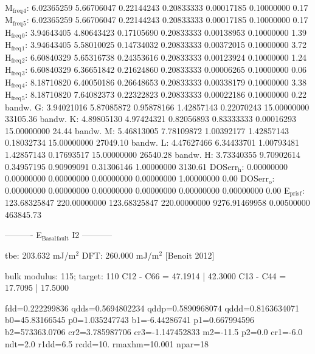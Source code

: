 \documentclass[11pt]{article}
\begin{document}
M\(_{\text{freq}}\)\(_{\text{4}}\):   6.02365259   5.66706047   0.22144243   0.20833333   0.00017185   0.10000000         0.17
M\(_{\text{freq}}\)\(_{\text{5}}\):   6.02365259   5.66706047   0.22144243   0.20833333   0.00017185   0.10000000         0.17
H\(_{\text{freq}}\)\(_{\text{0}}\):   3.94643405   4.80643423   0.17105690   0.20833333   0.00138953   0.10000000         1.39
H\(_{\text{freq}}\)\(_{\text{1}}\):   3.94643405   5.58010025   0.14734032   0.20833333   0.00372015   0.10000000         3.72
H\(_{\text{freq}}\)\(_{\text{2}}\):   6.60840329   5.65316738   0.24353616   0.20833333   0.00123924   0.10000000         1.24
H\(_{\text{freq}}\)\(_{\text{3}}\):   6.60840329   6.36651842   0.21624860   0.20833333   0.00006265   0.10000000         0.06
H\(_{\text{freq}}\)\(_{\text{4}}\):   8.18710820   6.40050186   0.26648653   0.20833333   0.00338179   0.10000000         3.38
H\(_{\text{freq}}\)\(_{\text{5}}\):   8.18710820   7.64082373   0.22322823   0.20833333   0.00022186   0.10000000         0.22
bandw. G:   3.94021016   5.87085872   0.95878166   1.42857143   0.22070243  15.00000000     33105.36
bandw. K:   4.89805130   4.97424321   0.82056893   0.83333333   0.00016293  15.00000000        24.44
bandw. M:   5.46813005   7.78109872   1.00392177   1.42857143   0.18032734  15.00000000     27049.10
bandw. L:   4.47627466   6.34433701   1.00793481   1.42857143   0.17693517  15.00000000     26540.28
bandw. H:   3.73340355   9.70902614   0.34957195   0.90909091   0.31306146   1.00000000      3130.61
DOSerr\(_{\text{h}}\):   0.00000000   0.00000000   0.00000000   0.00000000   0.00000000   1.00000000         0.00
DOSerr\(_{\text{o}}\):   0.00000000   0.00000000   0.00000000   0.00000000   0.00000000   0.00000000         0.00
E\(_{\text{pris}}\)\(_{\text{f}}\): 123.68325847 220.00000000 123.68325847 220.00000000 9276.91469958 0.00500000    463845.73

----------     E\(_{\text{Basal}}\)\(_{\text{fault}}\) I2     -----------

tbe:       203.632 mJ/m\(^{\text{2}}\)
DFT:       260.000 mJ/m\(^{\text{2}}\) [Benoit  2012]

bulk modulus: 115; target: 110 
                      C12 - C66 = 47.1914  |  42.3000
                      C13 - C44 = 17.7095  |  17.5000


fdd=0.222299836 qdds=0.5694802234 qddp=0.5890968074 qddd=0.8163634071 b0=45.83166545 p0=1.035247743 b1=-6.44286741 p1=0.667994596 b2=573363.0706 cr2=3.785987706 cr3=-1.147452833 m2=-11.5 p2=0.0 cr1=-6.0 ndt=2.0 r1dd=6.5 rcdd=10. rmaxhm=10.001 npar=18
\end{document}
